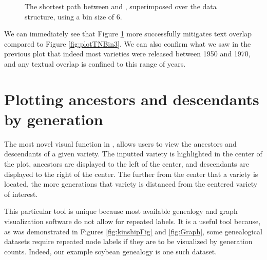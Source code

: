 \documentclass[article,shortnames]{jss}
\begin{document}
\clearpage

\begin{figure}[H]
    \centering
    \caption{The shortest path between  and , superimposed over the data structure, using a bin size of 6.}
    \label{fig:plotTNBin6}
\end{figure}

We can immediately see that Figure \ref{fig:plotTNBin6} more successfully mitigates text overlap compared to Figure \ref{fig:plotTNBin3}. We can also confirm what we saw in the previous plot that indeed most varieties were released between 1950 and 1970, and any textual overlap is confined to this range of years.

\section{Plotting ancestors and descendants by generation}
\label{remedy}

The most novel visual function in ,  allows users to view the ancestors and descendants of a given variety. The inputted variety is highlighted in the center of the plot, ancestors are displayed to the left of the center, and descendants are displayed to the right of the center. The further from the center that a variety is located, the more generations that variety is distanced from the centered variety of interest.

This particular  tool is unique because most available genealogy and graph visualization software do not allow for repeated labels. It is a useful tool because, as was demonstrated in Figures \ref{fig:kinshipFig} and \ref{fig:Graph}, some genealogical datasets require repeated node labels if they are to be visualized by generation counts. Indeed, our example soybean genealogy is one such dataset.
\end{document}
